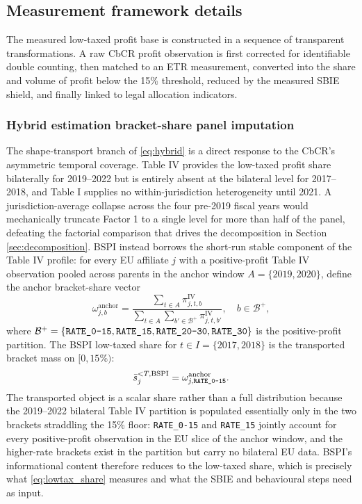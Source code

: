 \documentclass[11pt,a4paper]{article}
\newcommand{\code}[1]{\texttt{#1}}
\begin{document}
\subsection{Measurement framework details}\label{app:measurement_framework}

The measured low-taxed profit base is constructed in a sequence of transparent transformations. A raw CbCR profit observation is first corrected for identifiable double counting, then matched to an ETR measurement, converted into the share and volume of profit below the 15\% threshold, reduced by the measured SBIE shield, and finally linked to legal allocation indicators. 

\subsubsection{Hybrid estimation bracket-share panel imputation}\label{sec:bspi}

The shape-transport branch of \eqref{eq:hybrid} is a direct response to the CbCR's asymmetric temporal coverage. Table IV provides the low-taxed profit share bilaterally for 2019--2022 but is entirely absent at the bilateral level for 2017--2018, and Table I supplies no within-jurisdiction heterogeneity until 2021. A jurisdiction-average collapse across the four pre-2019 fiscal years would mechanically truncate Factor 1 to a single level for more than half of the panel, defeating the factorial comparison that drives the decomposition in Section \ref{sec:decomposition}. BSPI instead borrows the short-run stable component of the Table IV profile: for every EU affiliate $j$ with a positive-profit Table IV observation pooled across parents in the anchor window $A = \{2019, 2020\}$, define the anchor bracket-share vector
\begin{equation}\label{eq:bspi_anchor}
\omega_{j,b}^{\text{anchor}} = \frac{\sum_{t \in A}\pi_{j,t,b}^{\text{IV}}}{\sum_{t \in A}\sum_{b' \in \mathcal{B}^{+}}\pi_{j,t,b'}^{\text{IV}}}, \quad b \in \mathcal{B}^{+},
\end{equation}
where $\mathcal{B}^{+} = \{\code{RATE\_0\text{-}15},\code{RATE\_15},\code{RATE\_20\text{-}30},\code{RATE\_30}\}$ is the positive-profit partition. The BSPI low-taxed share for $t \in I = \{2017, 2018\}$ is the transported bracket mass on $[0, 15\%)$:
\begin{equation}\label{eq:bspi}
\bar{s}_{j}^{<T,\text{BSPI}} = \omega_{j,\code{RATE\_0\text{-}15}}^{\text{anchor}}.
\end{equation}
The transported object is a scalar share rather than a full distribution because the 2019--2022 bilateral Table IV partition is populated essentially only in the two brackets straddling the 15\% floor: \code{RATE\_0-15} and \code{RATE\_15} jointly account for every positive-profit observation in the EU slice of the anchor window, and the higher-rate brackets exist in the partition but carry no bilateral EU data. BSPI's informational content therefore reduces to the low-taxed share, which is precisely what \eqref{eq:lowtax_share} measures and what the SBIE and behavioural steps need as input.
\end{document}
